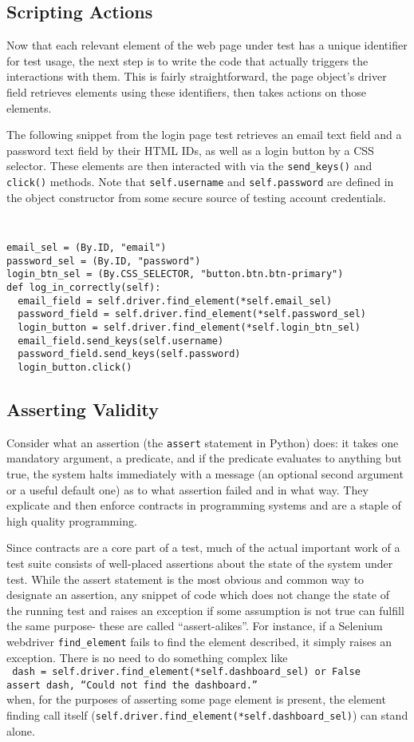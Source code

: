\subsection{Scripting Actions}
Now that each relevant element of the web page under test has a unique identifier for test usage, the next step is to write the code that actually triggers the interactions with them. This is fairly straightforward, the page object's driver field retrieves elements using these identifiers, then takes actions on those elements.

The following snippet from the login page test retrieves an email text field and a password text field by their HTML IDs, as well as a login button by a CSS selector. These elements are then interacted with via the \texttt{send\_keys()} and \texttt{click()} methods. Note that \texttt{self.username} and \texttt{self.password} are defined in the object constructor from some secure source of testing account credentials.

{\tt
\begin{verbatim}
email_sel = (By.ID, "email")
password_sel = (By.ID, "password")
login_btn_sel = (By.CSS_SELECTOR, "button.btn.btn-primary")
def log_in_correctly(self):
  email_field = self.driver.find_element(*self.email_sel)
  password_field = self.driver.find_element(*self.password_sel)
  login_button = self.driver.find_element(*self.login_btn_sel)
  email_field.send_keys(self.username)
  password_field.send_keys(self.password)
  login_button.click()
\end{verbatim}
}

\subsection{Asserting Validity}
Consider what an assertion (the \texttt{assert} statement in Python) does: it takes one mandatory argument, a predicate, and if the predicate evaluates to anything but true, the system halts immediately with a message (an optional second argument or a useful default one) as to what assertion failed and in what way. They explicate and then enforce contracts in programming systems and are a staple of high quality programming.

Since contracts are a core part of a test, much of the actual important work of a test suite consists of well-placed assertions about the state of the system under test. While the assert statement is the most obvious and common way to designate an assertion, any snippet of code which does not change the state of the running test and raises an exception if some assumption is not true can fulfill the same purpose- these are called ``assert-alikes''. For instance, if a Selenium webdriver \texttt{find\_element} fails to find the element described, it simply raises an exception. There is no need to do something complex like\\
\texttt{
 dash = self.driver.find\_element(*self.dashboard\_sel) or False\\
 assert dash, ``Could not find the dashboard.''\\
}
when, for the purposes of asserting some page element is present, the element finding call itself (\texttt{self.driver.find\_element(*self.dashboard\_sel)}) can stand alone.

